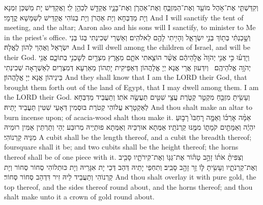 {{וְקִדַּשְׁתִּ֛י אֶת־אֹ֥הֶל מוֹעֵ֖ד וְאֶת־הַמִּזְבֵּ֑חַ וְאֶת־אַהֲרֹ֧ן וְאֶת־בָּנָ֛יו אֲקַדֵּ֖שׁ לְכַהֵ֥ן לִֽי׃}
{וַאֲקַדֵּישׁ יָת מַשְׁכַּן זִמְנָא וְיָת מַדְבְּחָא וְיָת אַהֲרֹן וְיָת בְּנוֹהִי אֲקַדֵּישׁ לְשַׁמָּשָׁא קֳדָמָי׃}
{And I will sanctify the tent of meeting, and the altar; Aaron also and his sons will I sanctify, to minister to Me in the priest’s office.}{}
{וְשָׁ֣כַנְתִּ֔י בְּת֖וֹךְ בְּנֵ֣י יִשְׂרָאֵ֑ל וְהָיִ֥יתִי לָהֶ֖ם לֵאלֹהִֽים׃}
{וְאַשְׁרֵי שְׁכִינְתִי בְּגוֹ בְּנֵי יִשְׂרָאֵל וְאֶהְוֵי לְהוֹן לֶאֱלָהּ׃}
{And I will dwell among the children of Israel, and will be their God.}{}
{וְיָדְע֗וּ כִּ֣י אֲנִ֤י יְהֹוָה֙ אֱלֹ֣הֵיהֶ֔ם אֲשֶׁ֨ר הוֹצֵ֧אתִי אֹתָ֛ם מֵאֶ֥רֶץ מִצְרַ֖יִם לְשׇׁכְנִ֣י בְתוֹכָ֑ם אֲנִ֖י יְהֹוָ֥ה אֱלֹהֵיהֶֽם׃ \petucha 
{}}
{וְיִדְּעוּן אֲרֵי אֲנָא יְיָ אֱלָהֲהוֹן דְּאַפֵּיקִית יָתְהוֹן מֵאַרְעָא דְּמִצְרַיִם לְאַשְׁרָאָה שְׁכִינְתִי בֵּינֵיהוֹן אֲנָא יְיָ אֱלָהֲהוֹן׃}
{And they shall know that I am the LORD their God, that brought them forth out of the land of Egypt, that I may dwell among them. I am the LORD their God.}{}
\newperek
{}%
{וְעָשִׂ֥יתָ מִזְבֵּ֖חַ מִקְטַ֣ר קְטֹ֑רֶת עֲצֵ֥י שִׁטִּ֖ים תַּעֲשֶׂ֥ה אֹתֽוֹ׃
}
{וְתַעֲבֵיד מַדְבְּחָא לְאַקְטָרָא עֲלוֹהִי קְטֹרֶת בּוּסְמִין דְּאָעֵי שִׁטִּין תַּעֲבֵיד יָתֵיהּ׃}
{And thou shalt make an altar to burn incense upon; of acacia-wood shalt thou make it.}{}
{אַמָּ֨ה אׇרְכּ֜וֹ וְאַמָּ֤ה רׇחְבּוֹ֙ רָב֣וּעַ יִהְיֶ֔ה וְאַמָּתַ֖יִם קֹמָת֑וֹ מִמֶּ֖נּוּ קַרְנֹתָֽיו׃}
{אַמְּתָא אוּרְכֵּיהּ וְאַמְּתָא פוּתְיֵיהּ מְרוּבַּע יְהֵי וְתַרְתֵּין אַמִּין רוּמֵיהּ מִנֵּיהּ קַרְנוֹהִי׃}
{A cubit shall be the length thereof, and a cubit the breadth thereof; foursquare shall it be; and two cubits shall be the height thereof; the horns thereof shall be of one piece with it.}{}
{וְצִפִּיתָ֨ אֹת֜וֹ זָהָ֣ב טָה֗וֹר אֶת־גַּגּ֧וֹ וְאֶת־קִירֹתָ֛יו סָבִ֖יב וְאֶת־קַרְנֹתָ֑יו וְעָשִׂ֥יתָ לּ֛וֹ זֵ֥ר זָהָ֖ב סָבִֽיב׃
}
{וְתִחְפֵי יָתֵיהּ דְּהַב דְּכֵי יָת אִגָּרֵיהּ וְיָת כּוּתְלוֹהִי סְחוֹר סְחוֹר וְיָת קַרְנוֹהִי וְתַעֲבֵיד לֵיהּ זִיר דִּדְהַב סְחוֹר סְחוֹר׃}
{And thou shalt overlay it with pure gold, the top thereof, and the sides thereof round about, and the horns thereof; and thou shalt make unto it a crown of gold round about.}{}
}
